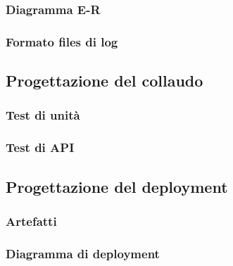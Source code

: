 \documentclass{article}
\begin{document}
\subsubsection{Diagramma E-R}

\subsubsection{Formato files di log}


\subsection{Progettazione del collaudo}
\subsubsection{Test di unità}

\subsubsection{Test di API}


\subsection{Progettazione del deployment}
\subsubsection{Artefatti}

\subsubsection{Diagramma di deployment}

\end{document}
